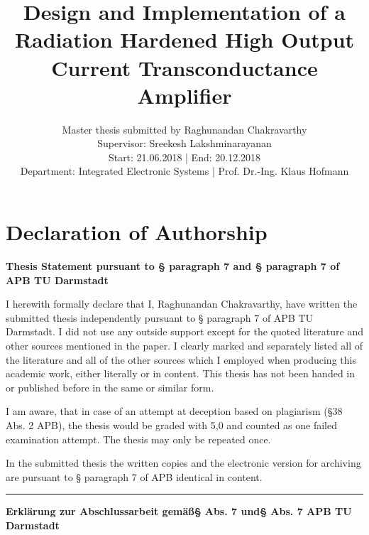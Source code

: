 \documentclass[linedtoc,
               parskip,
               twoside,
               longdoc,
               11pt,
               noheadingspace,
               accentcolor=tud1d,
               bigchapter,
               colorback]{tudreport}
\title{Design and Implementation of a Radiation Hardened High Output Current Transconductance Amplifier}
\subtitle{Master thesis submitted by Raghunandan Chakravarthy\\
Supervisor: Sreekesh Lakshminarayanan\\
Start: 21.06.2018 | End: 20.12.2018\\
Department: Integrated Electronic Systems \hspace*{1cm}
| \hfill
Prof. Dr.-Ing. Klaus Hofmann}
\begin{document}


\maketitle
\cleardoublepage

\pagestyle{empty}

\pagestyle{plain}
\chapter*{Declaration of Authorship}


\textbf{Thesis Statement pursuant to \S{} paragraph 7 and \S{} paragraph 7 of APB TU Darmstadt}

I herewith formally declare that I, Raghunandan Chakravarthy, have written the submitted thesis independently pursuant to \S{} paragraph 7 of APB TU Darmstadt. I did not use any outside support except for the quoted literature and other sources mentioned in the paper. I clearly marked and separately listed all of the literature and all of the other sources which I employed when producing this academic work, either literally or in content. This thesis has not been handed in or published before in the same or similar form.

I am aware, that in case of an attempt at deception based on plagiarism (\S38 Abs. 2 APB), the thesis would be graded with 5,0 and counted as one failed examination attempt. The thesis may only be repeated once.

In the submitted thesis the written copies and the electronic version for archiving are pursuant to \S{} paragraph 7 of APB identical in content.


\noindent\rule{17.5cm}{0.4pt}


\textbf{Erkl\"arung zur Abschlussarbeit gem\"a\ss\enspace\S{} Abs. 7 und\enspace\S{} Abs. 7 APB TU Darmstadt}
\end{document}

